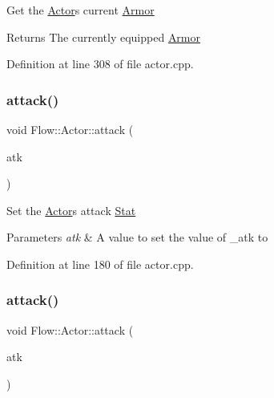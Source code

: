 Get the \hyperlink{class_flow_1_1_actor}{Actor}\textquotesingle{}s current \hyperlink{class_flow_1_1_armor}{Armor} \begin{DoxyReturn}{Returns}
The currently equipped \hyperlink{class_flow_1_1_armor}{Armor} 
\end{DoxyReturn}


Definition at line 308 of file actor.\+cpp.

\hypertarget{class_flow_1_1_actor_a7c829abc5329c2506ea0ffe5b029c1a9}{}\label{class_flow_1_1_actor_a7c829abc5329c2506ea0ffe5b029c1a9} 
\subsubsection{\texorpdfstring{attack()}{attack()}\hspace{0.1cm}{\footnotesize\ttfamily [1/3]}}
{\footnotesize\ttfamily void Flow\+::\+Actor\+::attack (\begin{DoxyParamCaption}\item[{unsigned char}]{atk }\end{DoxyParamCaption})}

Set the \hyperlink{class_flow_1_1_actor}{Actor}\textquotesingle{}s attack \hyperlink{class_flow_1_1_stat}{Stat} 
\begin{DoxyParams}{Parameters}
{\em atk} & A value to set the value of \+\_\+atk to \\
\hline
\end{DoxyParams}


Definition at line 180 of file actor.\+cpp.

\hypertarget{class_flow_1_1_actor_a7aee4043e372b4e1391418daa5728958}{}\label{class_flow_1_1_actor_a7aee4043e372b4e1391418daa5728958} 
\subsubsection{\texorpdfstring{attack()}{attack()}\hspace{0.1cm}{\footnotesize\ttfamily [2/3]}}
{\footnotesize\ttfamily void Flow\+::\+Actor\+::attack (\begin{DoxyParamCaption}\item[{const \hyperlink{class_flow_1_1_b_stat}{B\+Stat} \&}]{atk }\end{DoxyParamCaption})}


